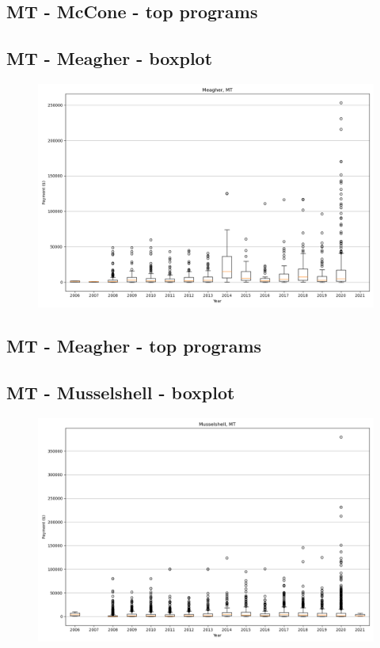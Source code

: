 \subsection*{MT - McCone - top programs}

\newpage
\subsection*{MT - Meagher - boxplot}
\begin{figure}[h]
\centering
\includegraphics[width=7in]{../output/boxplots/counties/Meagher-MT_boxplot.png}
\end{figure}


\subsection*{MT - Meagher - top programs}

\newpage
\subsection*{MT - Musselshell - boxplot}
\begin{figure}[h]
\centering
\includegraphics[width=7in]{../output/boxplots/counties/Musselshell-MT_boxplot.png}
\end{figure}


